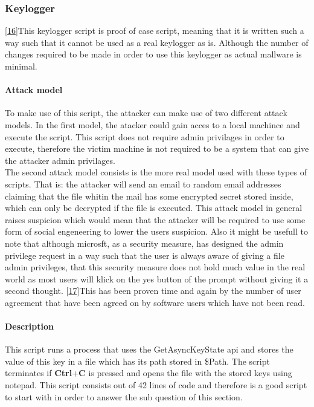 \documentclass{article}%
\begin{document}
\subsubsection{Keylogger}
[\hyperlink{16}{16}]This keylogger script is proof of case script, meaning that it is written such a way such that it cannot be used as a real keylogger as is. Although the number of changes required to be made in order to use this keylogger as actual mallware is minimal.
\paragraph{Attack model}\hfill
\newline
To make use of this script, the attacker can make use of two different attack models. In the first model, the atacker could gain acces to a local machince and execute the script. This script does not require admin privilages in order to execute, therefore the victim machine is not required to be a system that can give the attacker admin privilages.
\newline
\\
The second attack model consists is the more real model used with these types of scripts. That is: the attacker will send an email to random email addresses claiming that the file whitin the mail has some encrypted secret stored inside, which can only be decrypted if the file is executed. This attack model in general raises suspicion which would mean that the attacker will be required to use some form of social engeneering to lower the users suspicion. Also it might be usefull to note that although microsft, as a security measure, has designed the admin privilege request in a way such that the user is always aware of giving a file admin privileges, that this security measure does not hold much value in the real world as most users will klick on the yes button of the prompt without giving it a second thought. [\hyperlink{17}{17}]This has been proven time and again by the number of user agreement that have been agreed on by software users which have not been read.
\paragraph{Description}\hfill\newline
This script runs a process that uses the GetAsyncKeyState api and stores the value of this key in a file which has its path stored in \$Path. The script terminates if \textbf{Ctrl$+$C} is pressed and opens the file with the stored keys using notepad. This script consists out of 42 lines of code and therefore is a good script to start with in order to answer the sub question of this section.
\end{document}
